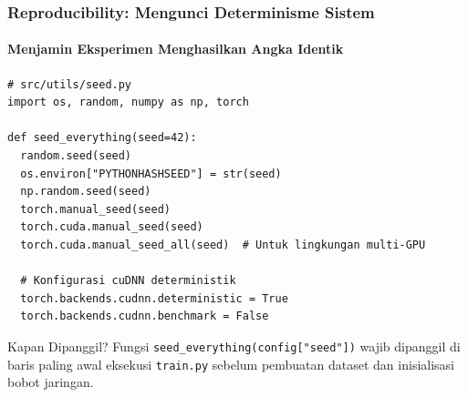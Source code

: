\documentclass[t,aspectratio=169,xcolor=dvipsnames]{beamer}
\begin{document}
\begin{frame}[fragile]
  \frametitle{Reproducibility: Mengunci Determinisme Sistem}
  \framesubtitle{Menjamin Eksperimen Menghasilkan Angka Identik}

\begin{lstlisting}[style=py]
# src/utils/seed.py
import os, random, numpy as np, torch

def seed_everything(seed=42):
  random.seed(seed)
  os.environ["PYTHONHASHSEED"] = str(seed)
  np.random.seed(seed)
  torch.manual_seed(seed)
  torch.cuda.manual_seed(seed)
  torch.cuda.manual_seed_all(seed)  # Untuk lingkungan multi-GPU
  
  # Konfigurasi cuDNN deterministik
  torch.backends.cudnn.deterministic = True
  torch.backends.cudnn.benchmark = False
\end{lstlisting}

  \begin{exampleblock}{Kapan Dipanggil?}
    \small
    Fungsi \texttt{seed\_everything(config["seed"])} wajib dipanggil di baris paling awal eksekusi \texttt{train.py} sebelum pembuatan dataset dan inisialisasi bobot jaringan.
  \end{exampleblock}
\end{frame}
\end{document}
